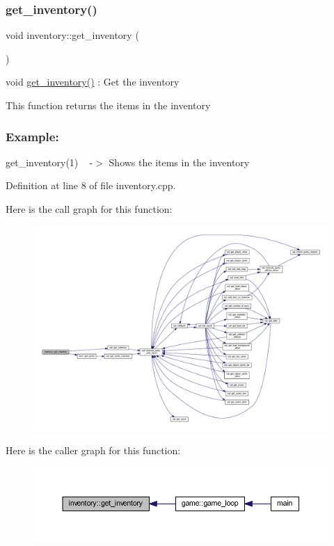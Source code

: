 \subsubsection{\texorpdfstring{get\+\_\+inventory()}{get\_inventory()}}
{\footnotesize\ttfamily void inventory\+::get\+\_\+inventory (\begin{DoxyParamCaption}{ }\end{DoxyParamCaption})}



void \hyperlink{classinventory_abb6d846e4b7297f79c2c9fb34b26fee2}{get\+\_\+inventory()} \+: Get the inventory 

This function returns the items in the inventory

\subsubsection*{Example\+: }

get\+\_\+inventory(1) ~\newline
-\/$>$ Shows the items in the inventory 

Definition at line 8 of file inventory.\+cpp.

Here is the call graph for this function\+:
\nopagebreak
\begin{figure}[H]
\begin{center}
\leavevmode
\includegraphics[width=350pt]{classinventory_abb6d846e4b7297f79c2c9fb34b26fee2_cgraph}
\end{center}
\end{figure}
Here is the caller graph for this function\+:
\nopagebreak
\begin{figure}[H]
\begin{center}
\leavevmode
\includegraphics[width=350pt]{classinventory_abb6d846e4b7297f79c2c9fb34b26fee2_icgraph}
\end{center}
\end{figure}


